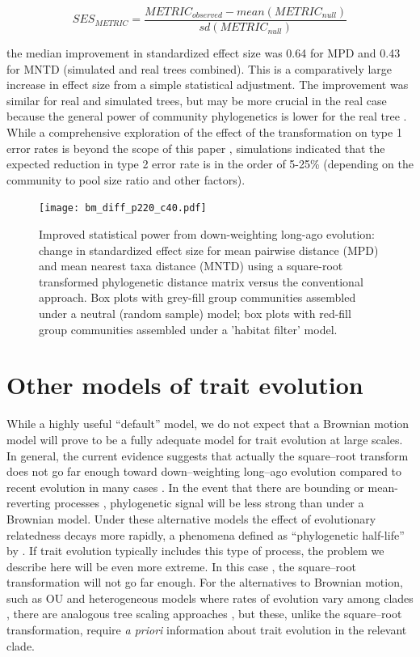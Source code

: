 $$SES_{METRIC} = \frac{METRIC_{observed} - mean(METRIC_{null})}{sd(METRIC_{null})}$$

the median improvement in standardized effect size was 0.64 
for MPD and 0.43 for MNTD (simulated and real trees combined). 
This is a comparatively large increase in effect size from a simple statistical 
adjustment.  The improvement was similar for real and simulated 
trees, but may be more crucial in the real case because the general power of 
community phylogenetics is lower for the real tree \citep{Kembel2006}. While a comprehensive exploration of the effect of the transformation on type 1 error rates is beyond the scope of this paper  \citep[see][]{kraft2007}, simulations indicated that the expected reduction in type 2 error rate is in the order of 5-25\% (depending on the community to pool size ratio and other factors).

\begin{figure}[H]
\centering
\texttt{[image: bm\_diff\_p220\_c40.pdf]}
\caption{Improved statistical power from down-weighting long-ago evolution: change in standardized effect size for mean pairwise 
distance (MPD) and mean nearest taxa distance (MNTD) using a square-root transformed phylogenetic distance matrix versus the 
conventional approach. Box plots with grey-fill group communities assembled under a neutral (random sample) model; box plots with 
red-fill group communities assembled under a 'habitat filter' model.}
\label{stat_power_fig}
\end{figure}

 
\section{Other models of trait evolution}

While a highly useful ``default'' model, we do not expect that a Brownian 
motion model will prove to be a fully adequate model for trait 
evolution at large scales. In general, the current evidence suggests that 
actually the square--root transform does not go far enough toward 
down--weighting long--ago evolution compared to recent evolution in many cases 
\citep{butler2004, harmon2010, smith2010evolution}. In the event that there 
are bounding or mean-reverting processes \citep[e.g. Ornstein--Uhlenbeck (OU)][]{butler2004}, phylogenetic 
signal will be less strong than under a Brownian model.  Under these alternative models the effect 
of evolutionary 
relatedness
decays more rapidly, a phenomena defined as ``phylogenetic half-life'' by \citet{hansen2008comparative}.  
If trait evolution typically includes this type of process, the problem we describe here will be even more extreme. 
In this case \citep[see][]{kelly2014phylogenetic}, the square--root transformation will not 
go far enough. For the alternatives to Brownian motion, such as OU and
heterogeneous models where rates of evolution vary among clades \citep{beaulieu2012modeling}, there are analogous tree scaling approaches \citep{Pearse2013a}, but these, unlike the square--root transformation, 
require \emph{a priori} information about trait evolution in the relevant 
clade.  

